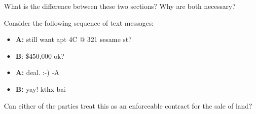 
\item What is the difference between these two sections? Why are both necessary?

\item Consider the following sequence of text messages:
\begin{itemize}
\item \textbf{A: }still want apt 4C @ 321 sesame st?

\item \textbf{B}: \$450,000 ok?

\item \textbf{A: }deal. :-) -A

\item \textbf{B: }yay! kthx bai 
\end{itemize}
Can either of the parties treat this as an enforceable contract for the sale of
land?
